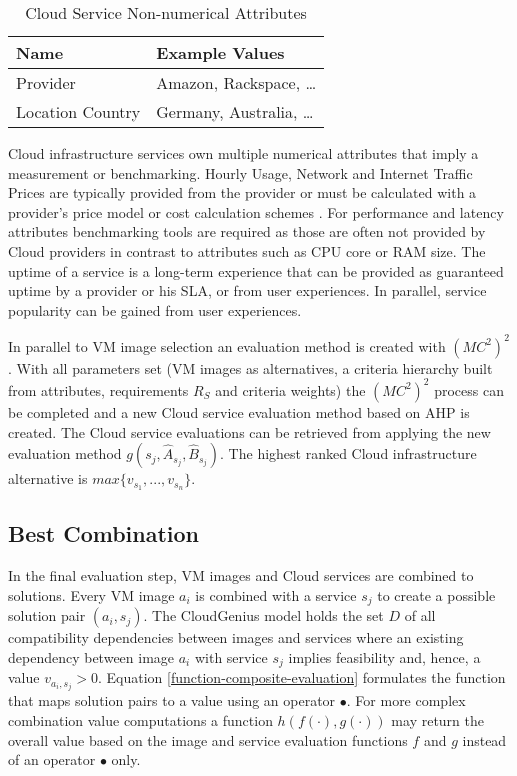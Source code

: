 \documentclass[10pt]{article}
\begin{document}
\begin{table}[!h]
\centering
\caption{Cloud Service Non-numerical Attributes}\label{service-nonnumerical-attributes}
\begin{tabular}{|l|l|} \hline
Name&Example Values\\ \hline
Provider&Amazon, Rackspace, \ldots\\
Location Country&Germany, Australia, \ldots\\
\hline\end{tabular}
\end{table}

Cloud infrastructure services own multiple numerical attributes that imply a measurement or benchmarking. Hourly Usage, Network and Internet Traffic Prices are typically provided from the provider or must be calculated with a provider's price model or cost calculation schemes \cite{klems2009clouds}\cite{khajeh2011decision}. For performance and latency attributes benchmarking tools are required as those are often not provided by Cloud providers \cite{lenk2011you} in contrast to attributes such as CPU core or RAM size. The uptime of a service is a long-term experience that can be provided as guaranteed uptime by a provider or his SLA, or from user experiences. In parallel, service popularity can be gained from user experiences.

In parallel to VM image selection an evaluation method is created with $(MC^2)^2$. With all parameters set (VM images as alternatives, a criteria hierarchy built from attributes, requirements $R_S$ and criteria weights) the $(MC^2)^2$ process can be completed and a new Cloud service evaluation method based on AHP is created. The Cloud service evaluations can be retrieved from applying the new evaluation method $g(s_j, \hat{A}_{s_j}, \hat{B}_{s_j})$. The highest ranked Cloud infrastructure alternative is $max \{v_{s_1}, ..., v_{s_n}\}$.

\subsection{Best Combination}

In the final evaluation step, VM images and Cloud services are combined to solutions. Every VM image $a_i$ is combined with a service $s_j$ to create a possible solution pair $(a_i, s_j)$. The CloudGenius model holds the set $D$ of all compatibility dependencies between images and services where an existing dependency between image $a_i$ with service $s_j$ implies feasibility and, hence, a value $v_{a_i,s_j} > 0$. Equation \ref{function-composite-evaluation} formulates the function that maps solution pairs to a value using an operator $\bullet$. For more complex combination value computations a function $h(f(\cdot),g(\cdot))$ may return the overall value based on the image and service evaluation functions $f$ and $g$ instead of an operator $\bullet$ only. 
\end{document}
